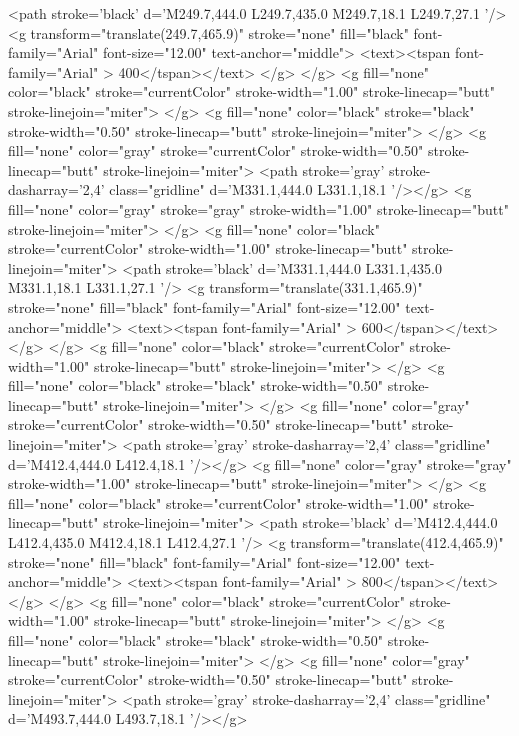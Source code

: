 	<path stroke='black'  d='M249.7,444.0 L249.7,435.0 M249.7,18.1 L249.7,27.1  '/>	<g transform="translate(249.7,465.9)" stroke="none" fill="black" font-family="Arial" font-size="12.00"  text-anchor="middle">
		<text><tspan font-family="Arial" > 400</tspan></text>
	</g>
</g>
<g fill="none" color="black" stroke="currentColor" stroke-width="1.00" stroke-linecap="butt" stroke-linejoin="miter">
</g>
<g fill="none" color="black" stroke="black" stroke-width="0.50" stroke-linecap="butt" stroke-linejoin="miter">
</g>
<g fill="none" color="gray" stroke="currentColor" stroke-width="0.50" stroke-linecap="butt" stroke-linejoin="miter">
	<path stroke='gray' stroke-dasharray='2,4' class="gridline"  d='M331.1,444.0 L331.1,18.1  '/></g>
<g fill="none" color="gray" stroke="gray" stroke-width="1.00" stroke-linecap="butt" stroke-linejoin="miter">
</g>
<g fill="none" color="black" stroke="currentColor" stroke-width="1.00" stroke-linecap="butt" stroke-linejoin="miter">
	<path stroke='black'  d='M331.1,444.0 L331.1,435.0 M331.1,18.1 L331.1,27.1  '/>	<g transform="translate(331.1,465.9)" stroke="none" fill="black" font-family="Arial" font-size="12.00"  text-anchor="middle">
		<text><tspan font-family="Arial" > 600</tspan></text>
	</g>
</g>
<g fill="none" color="black" stroke="currentColor" stroke-width="1.00" stroke-linecap="butt" stroke-linejoin="miter">
</g>
<g fill="none" color="black" stroke="black" stroke-width="0.50" stroke-linecap="butt" stroke-linejoin="miter">
</g>
<g fill="none" color="gray" stroke="currentColor" stroke-width="0.50" stroke-linecap="butt" stroke-linejoin="miter">
	<path stroke='gray' stroke-dasharray='2,4' class="gridline"  d='M412.4,444.0 L412.4,18.1  '/></g>
<g fill="none" color="gray" stroke="gray" stroke-width="1.00" stroke-linecap="butt" stroke-linejoin="miter">
</g>
<g fill="none" color="black" stroke="currentColor" stroke-width="1.00" stroke-linecap="butt" stroke-linejoin="miter">
	<path stroke='black'  d='M412.4,444.0 L412.4,435.0 M412.4,18.1 L412.4,27.1  '/>	<g transform="translate(412.4,465.9)" stroke="none" fill="black" font-family="Arial" font-size="12.00"  text-anchor="middle">
		<text><tspan font-family="Arial" > 800</tspan></text>
	</g>
</g>
<g fill="none" color="black" stroke="currentColor" stroke-width="1.00" stroke-linecap="butt" stroke-linejoin="miter">
</g>
<g fill="none" color="black" stroke="black" stroke-width="0.50" stroke-linecap="butt" stroke-linejoin="miter">
</g>
<g fill="none" color="gray" stroke="currentColor" stroke-width="0.50" stroke-linecap="butt" stroke-linejoin="miter">
	<path stroke='gray' stroke-dasharray='2,4' class="gridline"  d='M493.7,444.0 L493.7,18.1  '/></g>
